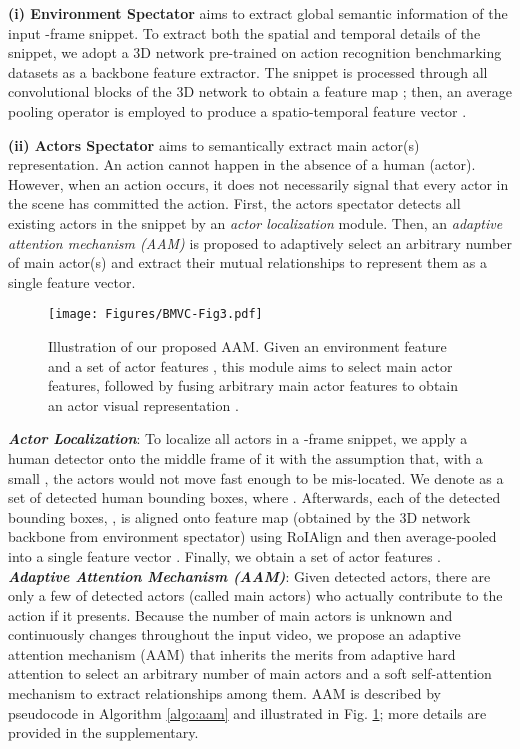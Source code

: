\documentclass{bmvc2k}
\begin{document}
\vspace{0.2cm}
\textbf{(i) Environment Spectator}
\label{subsubsec:env}
aims to extract global semantic information of the input -frame snippet. To extract both the spatial and temporal details of the snippet, we adopt a 3D network pre-trained on action recognition benchmarking datasets as a backbone feature extractor. The snippet is processed through all convolutional blocks of the 3D network to obtain a feature map ; then, an average pooling operator is employed to produce a spatio-temporal feature vector .






\vspace{0.2cm}
\textbf{(ii) Actors Spectator}
\label{subsubsec:actors}
aims to semantically extract main actor(s) representation. An action cannot happen in the absence of a human (actor). However, when an action occurs, it does not necessarily signal that every actor in the scene has committed the action. First, the actors spectator detects all existing actors in the snippet by an \textit{actor localization} module. Then, an \textit{adaptive attention mechanism (AAM)} is proposed to adaptively select an arbitrary number of main actor(s) and extract their mutual relationships to represent them as a single feature vector.

\begin{figure}[t]
\centering
  \texttt{[image: Figures/BMVC-Fig3.pdf]}
  \vspace*{-0.1cm}
  \caption{Illustration of our proposed AAM. Given an environment feature  and a set of actor features , this module aims to select main actor features, followed by fusing arbitrary main actor features to obtain an actor visual representation .}
  \vspace*{-0.4cm}
  \label{adaptive_attention}
\end{figure}

\noindent
\textit{\textbf{Actor Localization}}: 
To localize all actors in a -frame snippet, we apply a human detector onto the middle frame of it with the assumption that, with a small , the actors would not move fast enough to be mis-located. We denote   as a set of detected human bounding boxes, where . Afterwards, each of the detected bounding boxes, , is aligned onto feature map  (obtained by the 3D network backbone from environment spectator) using RoIAlign \cite{MaskRCNN_ICCV17} and then average-pooled into a single feature vector . Finally, we obtain a set of actor features . \\
\noindent
\textit{\textbf{Adaptive Attention Mechanism (AAM)}}:
Given  detected actors, there are only a few of detected actors (called main actors) who actually contribute to the action if it presents. Because the number of main actors is unknown and continuously changes throughout the input video, we propose an adaptive attention mechanism (AAM) that inherits the merits from adaptive hard attention to select an arbitrary number of main actors and a soft self-attention mechanism \cite{attention_is_all_you_need} to extract relationships among them. AAM is described by pseudocode in Algorithm \ref{algo:aam} and illustrated in Fig. \ref{adaptive_attention}; more details are provided in the supplementary.
\end{document}
